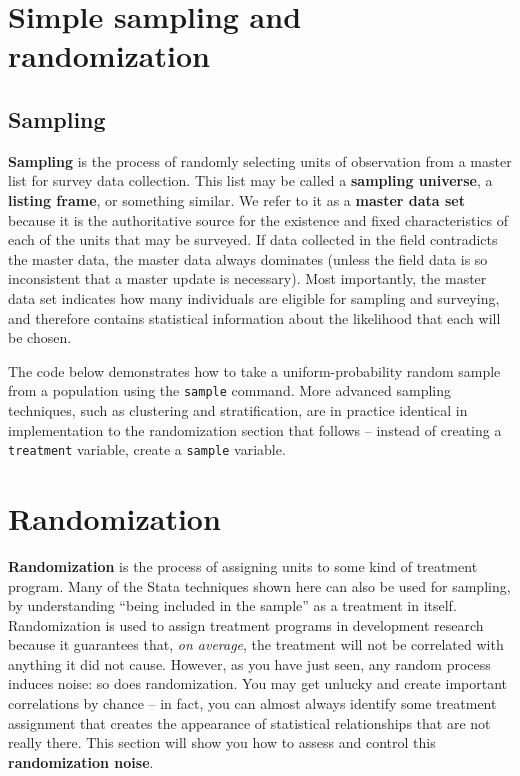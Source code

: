 
\section{Simple sampling and randomization}

\subsection{Sampling}

\textbf{Sampling} is the process of randomly selecting units of observation
from a master list for survey data collection.
This list may be called a \textbf{sampling universe}, a \textbf{listing frame}, or something similar.
We refer to it as a \textbf{master data set}
because it is the authoritative source
for the existence and fixed characteristics of each of the units that may be surveyed.
If data collected in the field contradicts the master data,
the master data always dominates
(unless the field data is so inconsistent that a master update is necessary).
Most importantly, the master data set indicates
how many individuals are eligible for sampling and surveying,
and therefore contains statistical information
about the likelihood that each will be chosen.

The code below demonstrates how to take
a uniform-probability random sample
from a population using the \texttt{sample} command.
More advanced sampling techniques,
such as clustering and stratification,
are in practice identical in implementation
to the randomization section that follows --
instead of creating a \texttt{treatment} variable,
create a \texttt{sample} variable.

\section{Randomization}

\textbf{Randomization} is the process of assigning units to some kind of treatment program.
Many of the Stata techniques shown here can also be used for sampling,
by understanding ``being included in the sample'' as a treatment in itself.
Randomization is used to assign treatment programs in development research
because it guarantees that, \textit{on average},
the treatment will not be correlated with anything it did not cause.\cite{duflo2007using}
However, as you have just seen,
any random process induces noise: so does randomization.
You may get unlucky and create important correlations by chance --
in fact, you can almost always identify some treatment assignment that
creates the appearance of statistical relationships that are not really there.
This section will show you how to assess and control this \textbf{randomization noise}.

